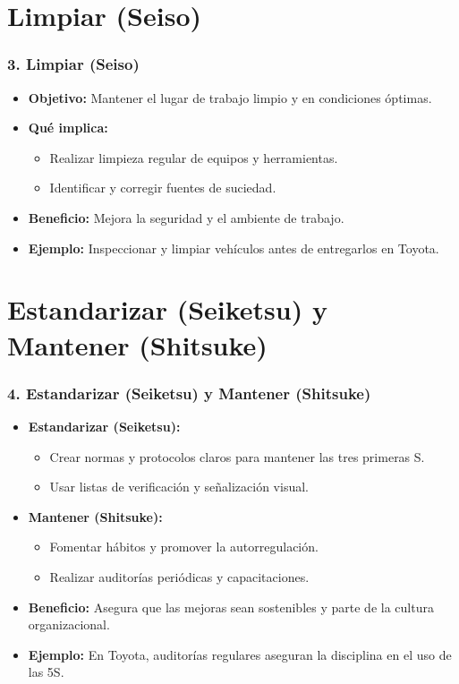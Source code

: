 \documentclass{beamer}
\begin{document}
\section{Limpiar (Seiso)}
\begin{frame}
\frametitle{3. Limpiar (Seiso)}
\begin{itemize}
    \item \textbf{Objetivo:} Mantener el lugar de trabajo limpio y en condiciones óptimas.
    \item \textbf{Qué implica:}
        \begin{itemize}
            \item Realizar limpieza regular de equipos y herramientas.
            \item Identificar y corregir fuentes de suciedad.
        \end{itemize}
    \item \textbf{Beneficio:} Mejora la seguridad y el ambiente de trabajo.
    \item \textbf{Ejemplo:} Inspeccionar y limpiar vehículos antes de entregarlos en Toyota.
\end{itemize}
\end{frame}

\section{Estandarizar (Seiketsu) y Mantener (Shitsuke)}
\begin{frame}
\frametitle{4. Estandarizar (Seiketsu) y Mantener (Shitsuke)}
\begin{itemize}
    \item \textbf{Estandarizar (Seiketsu):}
        \begin{itemize}
            \item Crear normas y protocolos claros para mantener las tres primeras S.
            \item Usar listas de verificación y señalización visual.
        \end{itemize}
    \item \textbf{Mantener (Shitsuke):}
        \begin{itemize}
            \item Fomentar hábitos y promover la autorregulación.
            \item Realizar auditorías periódicas y capacitaciones.
        \end{itemize}
    \item \textbf{Beneficio:} Asegura que las mejoras sean sostenibles y parte de la cultura organizacional.
    \item \textbf{Ejemplo:} En Toyota, auditorías regulares aseguran la disciplina en el uso de las 5S.
\end{itemize}
\end{frame}
\end{document}
